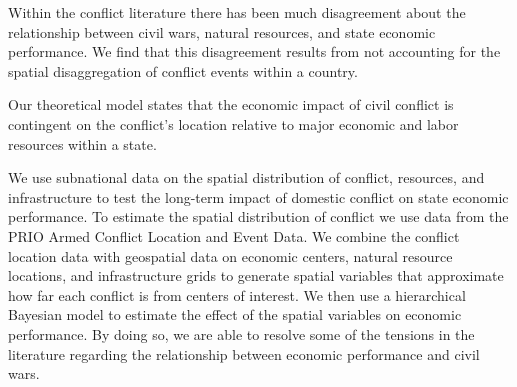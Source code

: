 


Within the conflict literature there has been much disagreement about the relationship between civil wars, natural resources, and state economic performance. We find that this disagreement results from not accounting for the spatial disaggregation of conflict events within a country.

Our theoretical model states that the economic impact of civil conflict is contingent on the conflict's location relative to major economic and labor resources within a state.

We use subnational data on the spatial distribution of conflict, resources, and infrastructure to test the long-term impact of domestic conflict on state economic performance. To estimate the spatial distribution of conflict we use data from the PRIO Armed Conflict Location and Event Data. We combine the conflict location data with geospatial data on economic centers, natural resource locations, and infrastructure grids to generate spatial variables that approximate how far each conflict is from centers of interest. We then use a hierarchical Bayesian model to estimate the effect of the spatial variables on economic performance. By doing so, we are able to resolve some of the tensions in the literature regarding the relationship between economic performance and civil wars. 